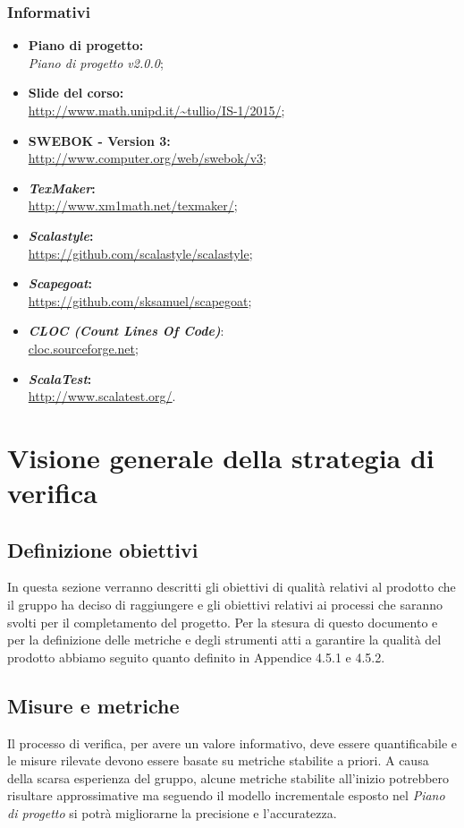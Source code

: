 \documentclass[a4paper]{article}
\begin{document}
			\subsubsection{Informativi}
				\begin{itemize}
					\item \textbf{Piano di progetto:} \\ \emph{Piano di progetto v2.0.0};
					\item \textbf{Slide del corso:} \\ \url{http://www.math.unipd.it/~tullio/IS-1/2015/};
					\item \textbf{SWEBOK - Version 3:} \\ \url{http://www.computer.org/web/swebok/v3};
					\item \textbf{\emph{TexMaker}:}\\ \url{http://www.xm1math.net/texmaker/};
				    \item \textbf{\emph{Scalastyle}:}\\ \url{https://github.com/scalastyle/scalastyle};
					\item \textbf{\emph{Scapegoat}:}\\ \url{https://github.com/sksamuel/scapegoat};
					\item \textbf{\emph{CLOC (Count Lines Of Code)}}:\\ \url{cloc.sourceforge.net};
					\item \textbf{\emph{ScalaTest}:}\\ \url{http://www.scalatest.org/}.
				\end{itemize}
	\section{Visione generale della strategia di verifica}
		
			\subsection{Definizione obiettivi}
			In questa sezione verranno descritti gli obiettivi di qualità relativi al prodotto che il 
			gruppo ha deciso di raggiungere e gli obiettivi relativi ai processi che saranno svolti per 
			il completamento del progetto.
			Per la stesura di questo documento e per la definizione delle metriche e degli strumenti atti a garantire la qualità del prodotto abbiamo seguito quanto definito in Appendice 4.5.1 e 4.5.2. 
	
\subsection{Misure e metriche}
			 Il processo di verifica, per avere un valore informativo, deve essere quantificabile e le misure rilevate
 devono essere basate su metriche stabilite a priori. 
 A causa della scarsa esperienza del gruppo, alcune metriche stabilite all'inizio potrebbero risultare approssimative ma
 seguendo il modello incrementale esposto nel \emph{Piano di progetto} si potrà migliorarne la precisione e l'accuratezza.
\end{document}
